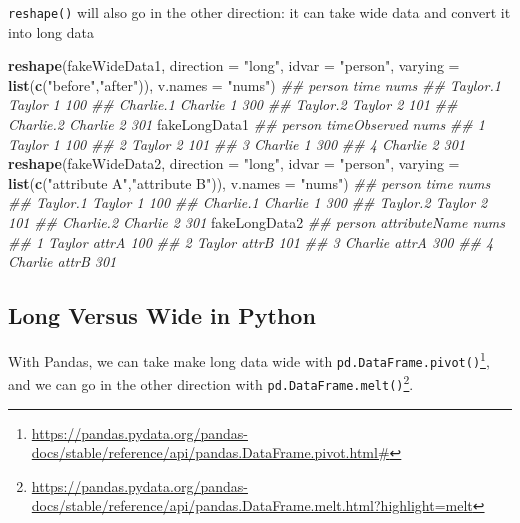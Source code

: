 \documentclass[12pt,krantz2]{krantz}
\makeatletter
\newenvironment{Shaded}{\begin{snugshade}}{\end{snugshade}}
\newcommand{\CommentTok}[1]{\textcolor[rgb]{0.37,0.37,0.37}{\textit{#1}}}
\newcommand{\DataTypeTok}[1]{\textcolor[rgb]{0.27,0.27,0.27}{#1}}
\newcommand{\KeywordTok}[1]{\textcolor[rgb]{0.27,0.27,0.27}{\textbf{#1}}}
\newcommand{\NormalTok}[1]{#1}
\newcommand{\StringTok}[1]{\textcolor[rgb]{0.5,0.5,0.5}{#1}}
\renewcommand{\href}[2]{#2\footnote{\url{#1}}}
\newenvironment{kframe}{%
\medskip{}
\setlength{\fboxsep}{.8em}
 \def\at@end@of@kframe{}%
 \ifinner\ifhmode%
  \def\at@end@of@kframe{\end{minipage}}%
  \begin{minipage}{\columnwidth}%
 \fi\fi%
 \def\FrameCommand##1{\hskip\@totalleftmargin \hskip-\fboxsep
 \colorbox{shadecolor}{##1}\hskip-\fboxsep
     \hskip-\linewidth \hskip-\@totalleftmargin \hskip\columnwidth}%
 \MakeFramed {\advance\hsize-\width
   \@totalleftmargin\z@ \linewidth\hsize
   \@setminipage}}%
 {\par\unskip\endMakeFramed%
 \at@end@of@kframe}
\renewenvironment{Shaded}{\begin{kframe}}{\end{kframe}}
\makeatother
\begin{document}
\texttt{reshape()} will also go in the other direction: it can take wide data and convert it into long data

\begin{Shaded}
\begin{Highlighting}[]
\KeywordTok{reshape}\NormalTok{(fakeWideData1, }
        \DataTypeTok{direction =} \StringTok{"long"}\NormalTok{,}
        \DataTypeTok{idvar =} \StringTok{"person"}\NormalTok{, }
        \DataTypeTok{varying =} \KeywordTok{list}\NormalTok{(}\KeywordTok{c}\NormalTok{(}\StringTok{"before"}\NormalTok{,}\StringTok{"after"}\NormalTok{)),}
        \DataTypeTok{v.names =} \StringTok{"nums"}\NormalTok{)}
\CommentTok{##            person time nums}
\CommentTok{## Taylor.1   Taylor    1  100}
\CommentTok{## Charlie.1 Charlie    1  300}
\CommentTok{## Taylor.2   Taylor    2  101}
\CommentTok{## Charlie.2 Charlie    2  301}
\NormalTok{fakeLongData1}
\CommentTok{##    person timeObserved nums}
\CommentTok{## 1  Taylor            1  100}
\CommentTok{## 2  Taylor            2  101}
\CommentTok{## 3 Charlie            1  300}
\CommentTok{## 4 Charlie            2  301}
\KeywordTok{reshape}\NormalTok{(fakeWideData2, }
        \DataTypeTok{direction =} \StringTok{"long"}\NormalTok{,}
        \DataTypeTok{idvar =} \StringTok{"person"}\NormalTok{, }
        \DataTypeTok{varying =} \KeywordTok{list}\NormalTok{(}\KeywordTok{c}\NormalTok{(}\StringTok{"attribute A"}\NormalTok{,}\StringTok{"attribute B"}\NormalTok{)),}
        \DataTypeTok{v.names =} \StringTok{"nums"}\NormalTok{)}
\CommentTok{##            person time nums}
\CommentTok{## Taylor.1   Taylor    1  100}
\CommentTok{## Charlie.1 Charlie    1  300}
\CommentTok{## Taylor.2   Taylor    2  101}
\CommentTok{## Charlie.2 Charlie    2  301}
\NormalTok{fakeLongData2}
\CommentTok{##    person attributeName nums}
\CommentTok{## 1  Taylor         attrA  100}
\CommentTok{## 2  Taylor         attrB  101}
\CommentTok{## 3 Charlie         attrA  300}
\CommentTok{## 4 Charlie         attrB  301}
\end{Highlighting}
\end{Shaded}

\hypertarget{long-versus-wide-in-python}{%
\subsection{Long Versus Wide in Python}\label{long-versus-wide-in-python}}

With Pandas, we can take make long data wide with \href{https://pandas.pydata.org/pandas-docs/stable/reference/api/pandas.DataFrame.pivot.html\#}{\texttt{pd.DataFrame.pivot()}}, and we can go in the other direction with \href{https://pandas.pydata.org/pandas-docs/stable/reference/api/pandas.DataFrame.melt.html?highlight=melt}{\texttt{pd.DataFrame.melt()}}.
\end{document}
